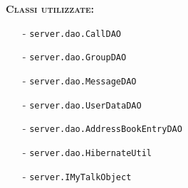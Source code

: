 \begin{description}
	\item{\scshape\bfseries Classi utilizzate:}
	\begin{itemize}[nolistsep, noitemsep]
	  \item[-] \texttt{server.dao.CallDAO}
	  \item[-] \texttt{server.dao.GroupDAO}
	  \item[-] \texttt{server.dao.MessageDAO}
	  \item[-] \texttt{server.dao.UserDataDAO}
	  \item[-] \texttt{server.dao.AddressBookEntryDAO}
	  \item[-] \texttt{server.dao.HibernateUtil}
	  \item[-] \texttt{server.IMyTalkObject}
	\end{itemize}
\end{description}



